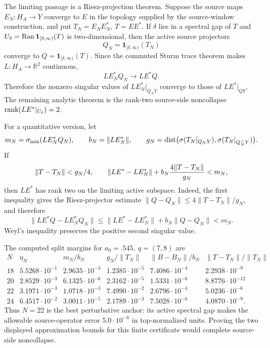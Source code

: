 \documentclass[11pt]{article}
\begin{document}
The limiting passage is a Riesz-projection theorem.  Suppose the source maps
\(E_N:H_A\to Y\) converge to \(E\) in the topology supplied by the source-window
construction, and put \(T_N=E_NE_N^\ast\), \(T=EE^\ast\).  If \(\delta\) lies in
a spectral gap of \(T\) and \(U_\delta={\rm Ran}\,\mathbf 1_{[\delta,\infty)}(T)\)
is two-dimensional, then the active source projectors
\[
  Q_N=\mathbf 1_{[\delta,\infty)}(T_N)
\]
converge to \(Q=\mathbf 1_{[\delta,\infty)}(T)\).  Since the commuted Sturm
trace theorem makes \(L:H_A\to\mathbb R^2\) continuous,
\[
  LE_N^\ast Q_N\longrightarrow LE^\ast Q.
\]
Therefore the nonzero singular values of \(LE_N^\ast|_{Q_NY}\) converge to
those of \(LE^\ast|_{QY}\).  The remaining analytic theorem is the rank-two
source-side noncollapse \( {\rm rank}(LE^\ast|_{U_\delta})=2\).

For a quantitative version, let
\[
  m_N=\sigma_{\min}(LE_N^\ast Q_N),\qquad
  b_N=\|LE_N^\ast\|,\qquad
  g_N={\rm dist}\bigl(\sigma(T_N|_{Q_NY}),\sigma(T_N|_{Q_N^\perp Y})\bigr).
\]
If
\[
  \|T-T_N\|<g_N/4,\qquad
  \|LE^\ast-LE_N^\ast\|+b_N{4\|T-T_N\|\over g_N}<m_N,
\]
then \(LE^\ast\) has rank two on the limiting active subspace.  Indeed, the
first inequality gives the Riesz-projector estimate
\(\|Q-Q_N\|\le4\|T-T_N\|/g_N\), and therefore
\[
  \|LE^\ast Q-LE_N^\ast Q_N\|
  \le \|LE^\ast-LE_N^\ast\|+b_N\|Q-Q_N\|<m_N.
\]
Weyl's inequality preserves the positive second singular value.

The computed split margins for \(a_0=.545,\ q=(7,8)\) are
\[
\begin{array}{c|c|c|c|c|c}
N&\eta_N&m_N/b_N&g_N/\|T_N\|&
\|B-B_N\|/b_N&\|T-T_N\|/\|T_N\|\\\hline
18&5.5268\cdot10^{-1}&2.9635\cdot10^{-3}&1.2385\cdot10^{-5}&
7.4086\cdot10^{-4}&2.2938\cdot10^{-9}\\
20&2.8529\cdot10^{-3}&6.1325\cdot10^{-6}&2.3162\cdot10^{-5}&
1.5331\cdot10^{-6}&8.8776\cdot10^{-12}\\
22&3.1971\cdot10^{-3}&1.0718\cdot10^{-3}&7.4990\cdot10^{-2}&
2.6796\cdot10^{-4}&5.0236\cdot10^{-6}\\
24&6.4517\cdot10^{-2}&3.0011\cdot10^{-5}&2.1789\cdot10^{-3}&
7.5028\cdot10^{-6}&4.0870\cdot10^{-9}.
\end{array}
\]
Thus \(N=22\) is the best perturbative anchor: its active spectral gap makes
the allowable source-operator error \(5.0\cdot10^{-6}\) in top-normalized
units.  Proving the two displayed approximation bounds for this finite
certificate would complete source-side noncollapse.
\end{document}

